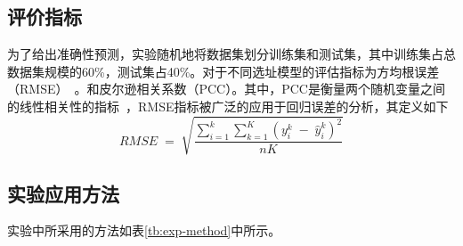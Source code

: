 \documentclass{llncs}
\begin{document}
\subsection{评价指标}
为了给出准确性预测，实验随机地将数据集划分训练集和测试集，其中训练集占总数据集规模的60\%，测试集占40\%。对于不同选址模型的评估指标为方均根误差（RMSE）~\cite{fortin2015should}。和皮尔逊相关系数（PCC）。其中，PCC是衡量两个随机变量之间的线性相关性的指标~\cite{schober2018correlation}，RMSE指标被广泛的应用于回归误差的分析，其定义如下
$$RMSE\;=\;\sqrt{\frac{{\displaystyle\sum_{i=1}^k}{\displaystyle\sum_{k=1}^K}\left(y_i^k\;-\;\widehat y_i^k\right)^2}{nK}}$$
\subsection{实验应用方法}
实验中所采用的方法如表\ref{tb:exp-method}中所示。
\end{document}
